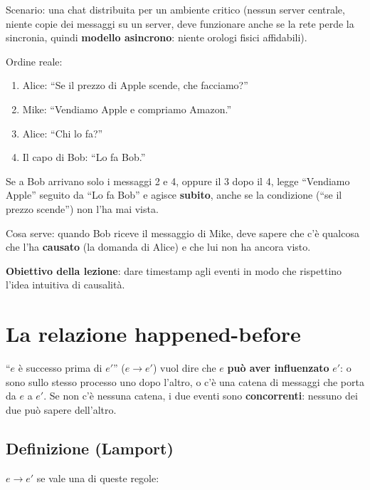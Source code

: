 Scenario: una chat distribuita per un ambiente critico (nessun server centrale, niente copie dei messaggi su un server, deve funzionare anche se la rete perde la sincronia, quindi \textbf{modello asincrono}: niente orologi fisici affidabili).

Ordine reale:

\begin{enumerate}
\def\labelenumi{\arabic{enumi}.}
\tightlist
\item
  Alice: ``Se il prezzo di Apple scende, che facciamo?''
\item
  Mike: ``Vendiamo Apple e compriamo Amazon.''
\item
  Alice: ``Chi lo fa?''
\item
  Il capo di Bob: ``Lo fa Bob.''
\end{enumerate}

Se a Bob arrivano solo i messaggi 2 e 4, oppure il 3 dopo il 4, legge ``Vendiamo Apple'' seguito da ``Lo fa Bob'' e agisce \textbf{subito}, anche se la condizione (``se il prezzo scende'') non l'ha mai vista.

Cosa serve: quando Bob riceve il messaggio di Mike, deve sapere che c'è qualcosa che l'ha \textbf{causato} (la domanda di Alice) e che lui non ha ancora visto.

\textbf{Obiettivo della lezione}: dare timestamp agli eventi in modo che rispettino l'idea intuitiva di causalità.

\section{La relazione happened-before}

\begin{inbreve}

``\(e\) è successo prima di \(e'\)'' (\(e \to e'\)) vuol dire che \(e\) \textbf{può aver influenzato} \(e'\): o sono sullo stesso processo uno dopo l'altro, o c'è una catena di messaggi che porta da \(e\) a \(e'\). Se non c'è nessuna catena, i due eventi sono \textbf{concorrenti}: nessuno dei due può sapere dell'altro.

\end{inbreve}

\subsection{Definizione (Lamport)}

\(e \to e'\) se vale una di queste regole:

